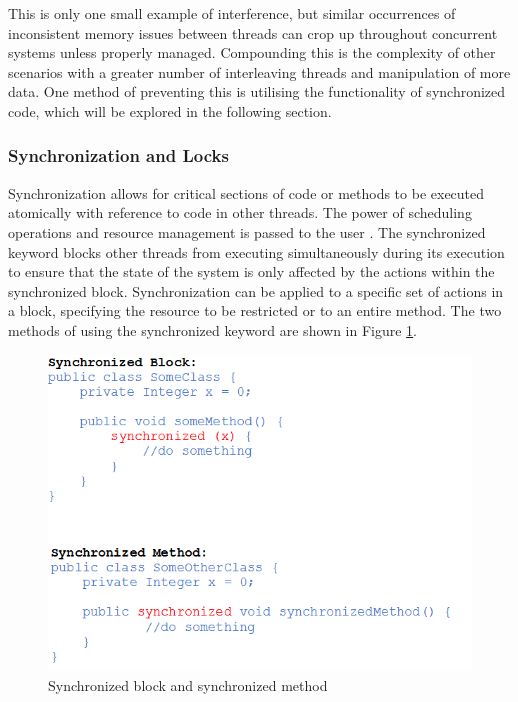\documentclass[a4paper,12pt]{article}
\begin{document}
 

This is only one small example of interference, but similar occurrences of inconsistent memory issues between threads can crop up throughout concurrent systems unless properly managed. Compounding this is the complexity of other scenarios with a greater number of interleaving threads and manipulation of more data. One method of preventing this is utilising the functionality of synchronized code, which will be explored in the following section.


\subsubsection{Synchronization and Locks}
    
Synchronization allows for critical sections of code or methods to be executed atomically with reference to code in other threads. The power of scheduling operations and resource management is passed to the user \citep{silberschatz13}. The synchronized keyword blocks other threads from executing simultaneously during its execution to ensure that the state of the system is only affected by the actions within the synchronized block. Synchronization can be applied to a specific set of actions in a block, specifying the resource to be restricted or to an entire method. The two methods of using the synchronized keyword are shown in Figure \ref{fig:synchronized}. 

\begin{figure}[h]
    \centering
    \includegraphics[scale = 0.8]{synchronized.png}
    \caption{Synchronized block and synchronized method}
    \label{fig:synchronized}
\end{figure}
\end{document}
